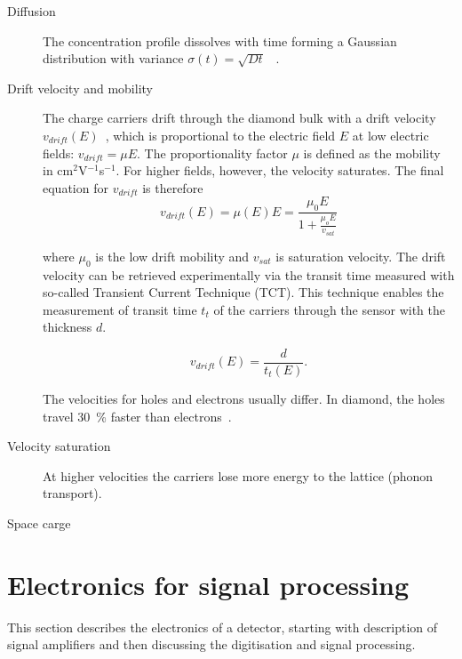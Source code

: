 \documentclass[12pt]{mytustyle}  %
\begin{document}
\begin{description}

\item[Diffusion]
The concentration profile dissolves with time forming a Gaussian distribution with variance $\sigma(t)=\sqrt{Dt}$~\cite{} .

\item[Drift velocity and mobility]
The charge carriers drift through the diamond bulk with a drift velocity $v_{drift}(E)$~\cite{}, which is proportional to the electric field $E$ at low electric fields: $v_{drift} = \mu E$. The proportionality factor $\mu$ is defined as the mobility in cm$^2$V$^{-1}$s$^{-1}$. For higher fields, however, the velocity saturates. The final equation for $v_{drift}$ is therefore
\begin{equation}
\label{eq:vsat}
v_{drift}(E) = \mu(E)E= \frac{\mu_0 E}{1 + \frac{\mu_o E}{v_{sat}}}
\end{equation}

where $\mu_0$ is the low drift mobility and $v_{sat}$ is saturation velocity. The drift velocity can be retrieved experimentally via the transit time measured with so-called Transient Current Technique (TCT). This technique enables the measurement of transit time $t_t$ of the carriers through the sensor with the thickness $d$. 

\begin{equation}
\label{eq:vsat}
v_{drift}(E) = \frac{d}{t_t(E)}.
\end{equation}

The velocities for holes and electrons usually differ. In diamond, the holes travel 30~\% faster than electrons~\cite{}.

\item[Velocity saturation]
At higher velocities the carriers lose more energy to the lattice (phonon transport).

\item[Space carge]


\end{description}













\clearpage
\section{Electronics for signal processing} %
\label{sec:elecsigproc}
This section describes the electronics of a detector, starting with description of signal amplifiers and then discussing the digitisation and signal processing.
\end{document}
